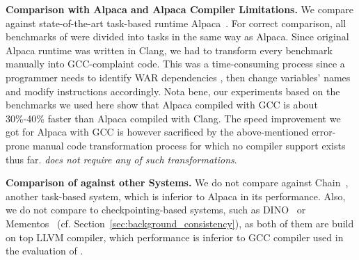 
\textbf{Comparison with Alpaca and Alpaca Compiler Limitations.} We compare \sys against state-of-the-art task-based runtime Alpaca~\cite{alpaca}. For correct comparison, all benchmarks of \sys were divided into tasks in the same way as Alpaca. Since original Alpaca runtime was written in Clang, we had to transform every benchmark manually into GCC-complaint code.  This was a time-consuming process since a programmer needs to identify WAR dependencies , then change variables' names and modify instructions accordingly. Nota bene, our experiments based on the benchmarks we used here show that Alpaca compiled with GCC is about 30\%-40\% faster than Alpaca compiled with Clang.  The speed improvement we got for Alpaca with GCC is however sacrificed by the above-mentioned error-prone manual code transformation process for which no compiler support exists thus far. \sys \emph{does not require any of such transformations}.

\textbf{Comparison of \sys against other Systems.} We do not compare \sys against Chain~\cite{chain}, another task-based system, which is inferior to Alpaca in its performance. Also, we do not compare \sys to checkpointing-based systems, such as DINO~\cite{dino} or Mementos~\cite{mementos} (cf. Section~\ref{sec:background_consistency}), as both of them are build on top LLVM compiler, which performance is inferior to GCC compiler used in the evaluation of \sys {}.
